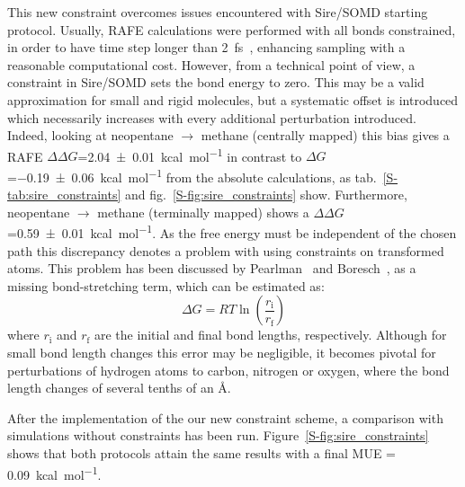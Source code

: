 \documentclass[journal=jctcce,manuscript=article]{achemso}
\begin{document}

This new constraint overcomes issues encountered with Sire/SOMD starting 
protocol.
Usually, RAFE calculations were performed with all bonds constrained, 
in order to have time step longer than \SI{2}{fs}~\cite{hopkins2015long},
enhancing sampling with a reasonable computational cost.
However, from a technical point of view, a constraint in Sire/SOMD sets the 
bond energy to zero.  This may be a valid approximation for small and rigid 
molecules, but a systematic offset is introduced which necessarily increases 
with every additional perturbation introduced.
Indeed, looking at neopentane $\rightarrow$ methane (centrally mapped) this 
bias gives a RAFE $\Delta\Delta G$=\SI{2.04 +- 0.01}{kcal.mol^{-1}} in contrast 
to $\Delta G$=\SI{-0.19+-0.06}{kcal.mol^{-1}} from the absolute calculations, 
as tab.~\ref{S-tab:sire_constraints} and fig.~\ref{S-fig:sire_constraints} show.
Furthermore, neopentane $\rightarrow$ methane (terminally mapped) shows a 
$\Delta\Delta G$ =\SI{0.59 +- 0.01}{kcal.mol^{-1}}. As the free energy must be 
independent of the chosen path this discrepancy denotes a problem with using 
constraints on transformed atoms. 
This problem has been discussed by Pearlman~\cite{pearlman1991overlooked} 
and Boresch~\cite{doi:10.1021/jp981628n, doi:10.1021/jp981629f}, 
as a missing bond-stretching term, which can be estimated as: 
\begin{equation}
 \label{eq:allbondserror}
 \Delta G= RT\ln \left ( \frac{r_{\mathrm{i}}}{r_\mathrm{f}} \right)  
\end{equation}
where $r_{\mathrm{i}}$ and $r_{\mathrm{f}}$ are the initial and final bond 
lengths, respectively.  Although for small bond length changes this error may 
be negligible, it becomes pivotal for perturbations of hydrogen atoms to 
carbon, nitrogen or oxygen, where the bond length changes of several tenths of 
an \AA.

After the implementation of the our new constraint scheme, a comparison with simulations without constraints has been run. 
Figure~\ref{S-fig:sire_constraints} shows 
that both protocols attain the same results with a final 
MUE = \SI{0.09}{kcal.mol^{-1}}.
\end{document}

